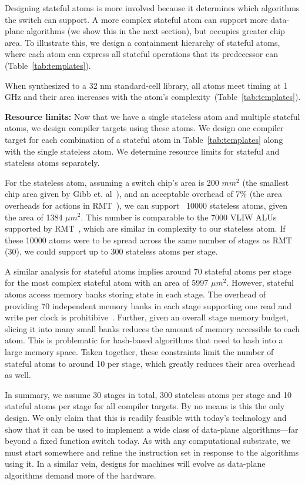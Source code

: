 Designing stateful atoms is more involved because it determines which
algorithms the switch can support. A more complex stateful atom can support
more data-plane algorithms (we show this in the next section), but occupies
greater chip area. To illustrate this, we design a containment hierarchy of
stateful atoms, where each atom can express all stateful operations that its
predecessor can (Table~\ref{tab:templates}).

When synthesized to a 32 nm standard-cell library, all atoms meet timing at 1
GHz and their area increases with the atom's
complexity~(Table~\ref{tab:templates}).

\textbf{Resource limits:}
Now that we have a single stateless atom and multiple stateful atoms, we design
compiler targets using these atoms.  We design one compiler target for each
combination of a stateful atom in Table~\ref{tab:templates} along with the
single stateless atom. We determine resource limits for stateful and stateless
atoms separately.

For the stateless atom, assuming a switch chip's area is 200 $mm^2$ (the
smallest chip area given by Gibb et. al~\cite{gibb_parsing}), and an acceptable
overhead of 7\% (the area overheads for actions in RMT~\cite{rmt}), we can
support ~10000 stateless atoms, given the area of 1384 $\mu m^2$.  This number
is comparable to the 7000 VLIW ALUs supported by RMT~\cite{rmt}, which are
similar in complexity to our stateless atom. If these 10000 atoms were to be
spread across the same number of stages as RMT (30), we could support up to 300
stateless atoms per stage.

A similar analysis for stateful atoms implies around 70 stateful atoms per
stage for the most complex stateful atom with an area of 5997 $\mu m^2$.
However, stateful atoms access memory banks storing state in each stage. The
overhead of providing 70 independent memory banks in each stage supporting one
read and write per clock is prohitibive~\cite{private_conv}. Further, given an
overall stage memory budget, slicing it into many small banks reduces the
amount of memory accessible to each atom. This is problematic for hash-based
algorithms that need to hash into a large memory space. Taken together, these
constraints limit the number of stateful atoms to around 10 per stage, which
greatly reduces their area overhead as well.

In summary, we assume 30 stages in total, 300 stateless atoms per stage and 10
stateful atoms per stage for all compiler targets. By no means is this the only
design. We only claim that this is readily feasible with today's technology and
show that it can be used to implement a wide class of data-plane
algorithms---far beyond a fixed function switch today. As with any
computational substrate, we must start somewhere and refine the instruction set
in response to the algorithms using it.  In a similar vein, designs for
\absmachine machines will evolve as data-plane algorithms demand more of the
hardware.

